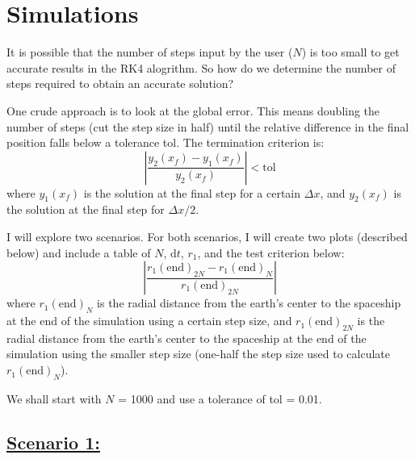 \documentclass{article}
\begin{document}
  \pagebreak

  \section{Simulations}
  It is possible that the number of steps input by the user ($N$) is too small to get accurate results in the RK4 alogrithm. So how do we determine the number of steps required to obtain an accurate solution?
  
  \vspace{\baselineskip}

  One crude approach is to look at the global error. This means doubling the number of steps (cut the step size in half) until the relative difference in the final position falls below a tolerance tol. The termination criterion is:
  \begin{equation*}
    \left|\frac{y_2(x_f) - y_1(x_f)}{y_2(x_f)}\right| < \textrm{tol}
  \end{equation*}
  where $y_1(x_f)$ is the solution at the final step for a certain $\Delta x$, and $y_2(x_f)$ is the solution at the final step for $\Delta x/2$.

  \vspace{\baselineskip}

  I will explore two scenarios. For both scenarios, I will create two plots (described below) and include a table of $N$, $\textrm{d}t$, $r_1$, and the test criterion below:
  \color{cyan}
  \begin{equation*}
    \left|\frac{r_1(\textrm{end})_{2N} - r_1(\textrm{end})_N}{r_1(\textrm{end})_{2N}}\right|
  \end{equation*}
  \color{white}
  where $r_1(\textrm{end})_N$ is the radial distance from the earth’s center to the spaceship at the end of the simulation using a certain step size, and $r_1(\textrm{end})_{2N}$ is the radial distance from the earth’s center to the spaceship at the end of the simulation using the smaller step size (one-half the step size used to calculate $r_1(\textrm{end})_N$).

  \vspace{\baselineskip}

  We shall start with $N$ = 1000 and use a tolerance of tol = 0.01.

  \pagebreak

  \subsection*{\underline{Scenario 1:}}
\end{document}
